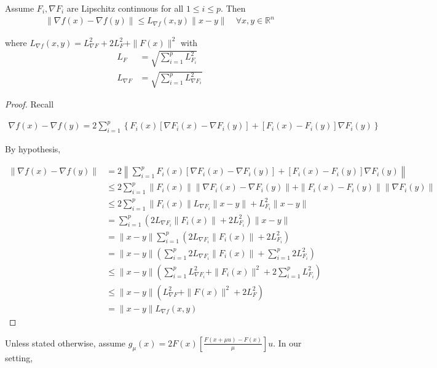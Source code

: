 \documentclass{article}
\begin{document}
\begin{lemma} \label{Lipschitz_grad_f}
Assume $F_i, \nabla F_i$ are Lipschitz continuous for all $1 \leq i \leq p$. Then 
\begin{align}
\|\nabla f(x) - \nabla f(y)\| \leq L_{\nabla f}(x,y)\|x-y\| \quad \forall x,y \in \mathbb{R}^n
\end{align}


where $L_{\nabla f}(x,y) = L_{\nabla F}^2 + 2L_F^2 + \|F(x)\|^2$ with 
\begin{align}
L_F & = \sqrt{\sum_{i=1}^pL_{F_i}^2} \\ L_{\nabla F} & = \sqrt{\sum_{i=1}^pL_{\nabla F_i}^2}
\end{align}

\begin{proof}
Recall

\begin{align}
\nabla f(x) - \nabla f(y) = 2\sum_{i=1}^p\left\{ F_i(x)[\nabla F_i(x)-\nabla F_i(y)] + [F_i(x)-F_i(y)]\nabla F_i(y) \right\} 
\end{align}

By hypothesis,

\begin{align*}
\| \nabla f(x) - \nabla f(y)\| & = 2\left\| \sum_{i=1}^pF_i(x)[\nabla F_i(x)-\nabla F_i(y)] + [F_i(x) - F_i(y)]\nabla F_i(y) \right\| \\ & \leq 2\sum_{i=1}^p\| F_i(x)\| \|\nabla F_i(x) - \nabla F_i(y)\| + \|F_i(x)-F_i(y)\| \|\nabla F_i(y)\| \\ & \leq 2\sum_{i=1}^p\| F_i(x)\| L_{\nabla F_i}\|x-y\| + L_{F_i}^2\|x-y\| \\ & = \sum_{i=1}^p\left(2L_{\nabla F_i}\|F_i(x)\| + 2L_{F_i}^2\right)\|x-y\| \\ & = \|x-y\| \sum_{i=1}^p\left(2L_{\nabla F_i}\|F_i(x)\| + 2L_{F_i}^2\right) \\ & = \|x-y\|\left(\sum_{i=1}^p2L_{\nabla F_i}\|F_i(x)\| + \sum_{i=1}^p2L_{F_i}^2\right) \\ & \leq \|x-y\|\left(\sum_{i=1}^pL_{\nabla F_i}^2 + \|F_i(x)\|^2 + 2\sum_{i=1}^pL_{F_i}^2\right) \\ & \leq \|x-y\|\left(L_{\nabla F}^2 + \|F(x)\|^2 + 2L_F^2\right) \\ & = \|x-y\|L_{\nabla f}(x,y)
\end{align*}

\end{proof}
\end{lemma}

Unless stated otherwise, assume $g_{\mu}(x) = 2F(x)\left[\frac{F(x+\mu u)-F(x)}{\mu}\right]u$. In our setting, 
\end{document}
